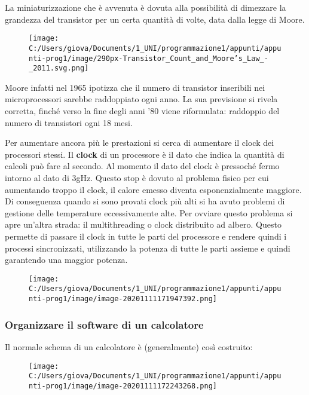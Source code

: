 \documentclass[
]{article}
\begin{document}
La miniaturizzazione che è avvenuta è dovuta alla possibilità di
dimezzare la grandezza del transistor per un certa quantità di volte,
data dalla legge di Moore.

\begin{figure}
\centering
\texttt{[image: C:/Users/giova/Documents/1\_UNI/programmazione1/appunti/appunti-prog1/image/290px-Transistor\_Count\_and\_Moore's\_Law\_-\_2011.svg.png]}
\caption{}
\end{figure}

Moore infatti nel 1965 ipotizza che il numero di transistor inseribili
nei microprocessori sarebbe raddoppiato ogni anno. La sua previsione si
rivela corretta, finché verso la fine degli anni '80 viene riformulata:
raddoppio del numero di transistori ogni 18 mesi.

Per aumentare ancora più le prestazioni si cerca di aumentare il clock
dei processori stessi. Il \textbf{clock} di un processore è il dato che
indica la quantità di calcoli può fare al secondo. Al momento il dato
del clock è pressoché fermo intorno al dato di 3gHz. Questo stop è
dovuto al problema fisico per cui aumentando troppo il clock, il calore
emesso diventa esponenzialmente maggiore. Di conseguenza quando si sono
provati clock più alti si ha avuto problemi di gestione delle
temperature eccessivamente alte. Per ovviare questo problema si apre
un'altra strada: il multithreading o clock distribuito ad albero. Questo
permette di passare il clock in tutte le parti del processore e rendere
quindi i processi sincronizzati, utilizzando la potenza di tutte le
parti assieme e quindi garantendo una maggior potenza.

\begin{figure}
\centering
\texttt{[image: C:/Users/giova/Documents/1\_UNI/programmazione1/appunti/appunti-prog1/image/image-20201111171947392.png]}
\caption{}
\end{figure}

\hypertarget{header-n117}{%
\subsubsection{Organizzare il software di un
calcolatore}\label{header-n117}}

Il normale schema di un calcolatore è (generalmente) così costruito:

\begin{figure}
\centering
\texttt{[image: C:/Users/giova/Documents/1\_UNI/programmazione1/appunti/appunti-prog1/image/image-20201111172243268.png]}
\caption{}
\end{figure}
\end{document}
